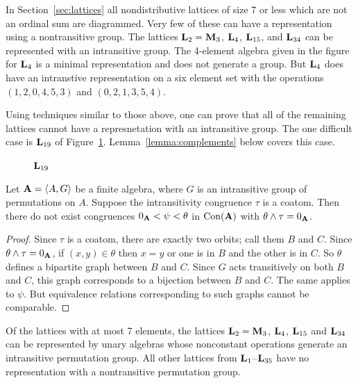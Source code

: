 In Section~\ref{sec:lattices} 
all nondistributive lattices
of size 7 or less which are not an ordinal sum are diagrammed. 
Very few of these can have a representation using a nontransitive
group. The lattices $\mathbf{L}_2 = \mathbf{M}_3$, $\mathbf{L}_4$, $\mathbf{L}_{15}$, 
and $\mathbf{L}_{34}$ can be represented with an intransitive group. 
The 4-element algebra given in the figure for $\mathbf{L}_4$ is a minimal 
representation and does not generate a group. But $\mathbf{L}_4$ does 
have an intranstive representation on a six element set with
the operations $(1,2,0,4,5,3)$ and $(0,2,1,3,5,4)$. 

Using techniques similar to those above, one
can prove that all of the remaining lattices cannot
have a represnetation with an intransitive group.
The one difficult case is $\mathbf{L}_{19}$ of Figure~\ref{fig:L19}.
Lemma~\ref{lemma:complements} below covers this case.

\begin{figure}[htb]
\begin{center}
\end{center}
\caption{$\mathbf{L}_{19}$}\label{fig:L19}
\end{figure}

\begin{lemma}\label{lemma:complements}
Let $\mathbf{A} = \langle A,G\rangle$ be a finite algebra, where
$G$ is an intransitive group of permutations on $A$.
Suppose the intransitivity congruence $\tau$ is a coatom.
Then there do not exist congruences
$0_{\mathbf{A}} < \psi < \theta$ in $\operatorname{Con}(\mathbf{A})$
with $\theta \wedge \tau = 0_{\mathbf{A}}$. 
\end{lemma}

\begin{proof}
Since $\tau$ is a coatom, there are exactly two orbits; call
them $B$ and $C$. Since $\theta \wedge \tau = 0_{\mathbf{A}}$, if
$(x,y) \in \theta$ then $x=y$ or one is in $B$ and the other
is in $C$. So $\theta$ defines a bipartite graph between
$B$ and $C$. Since $G$ acts transitively on both $B$ and $C$,
this graph corresponds to a bijection between $B$ and $C$. 
The same applies to $\psi$. But equivalence relations
corresponding to such graphs cannot be comparable.
\end{proof}

\begin{theorem}
Of the lattices with at most 7 elements, the lattices
$\mathbf{L}_2 = \mathbf{M}_3$, $\mathbf{L}_4$, $\mathbf{L}_{15}$ and $\mathbf{L}_{34}$ can be
represented by unary algebras whose nonconstant operations
generate an intransitive permutation group. All other
lattices from $\mathbf{L}_1$--$\mathbf{L}_{35}$ have no representation 
with a nontransitive permutation group.
\end{theorem}

